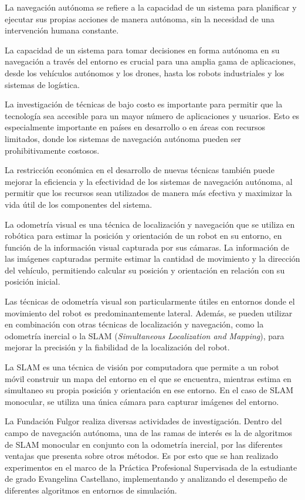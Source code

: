 \documentclass[
11pt, %
codirector, %
]{charter}
\begin{document}
La navegación autónoma se refiere a la capacidad de un sistema para planificar y ejecutar sus propias acciones de manera autónoma, sin la necesidad de una intervención humana constante.

La capacidad de un sistema para tomar decisiones en forma autónoma en su navegación a través del entorno es crucial para una amplia gama de aplicaciones, desde los vehículos autónomos y los drones, hasta los robots industriales y los sistemas de logística.

La investigación de técnicas de bajo costo es importante para permitir que la tecnología sea accesible para un mayor número de aplicaciones y usuarios. Esto es especialmente importante en países en desarrollo o en áreas con recursos limitados, donde los sistemas de navegación autónoma pueden ser prohibitivamente costosos.

La restricción económica en el desarrollo de nuevas técnicas también puede mejorar la eficiencia y la efectividad de los sistemas de navegación autónoma, al permitir que los recursos sean utilizados de manera más efectiva y maximizar la vida útil de los componentes del sistema.

La odometría visual es una técnica de localización y navegación que se utiliza en robótica para estimar la posición y orientación de un robot en su entorno, en función de la información visual capturada por sus cámaras. La información de las imágenes capturadas permite estimar la cantidad de movimiento y la dirección del vehículo, permitiendo calcular su posición y orientación en relación con su posición inicial.

Las técnicas de odometría visual son particularmente útiles en entornos donde el movimiento del robot es predominantemente lateral. Además, se pueden utilizar en combinación con otras técnicas de localización y navegación, como la odometría inercial o la SLAM (\textit{Simultaneous Localization and Mapping}), para mejorar la precisión y la fiabilidad de la localización del robot.

La SLAM es una técnica de visión por computadora que permite a un robot móvil construir un mapa del entorno en el que se encuentra, mientras estima en simultaneo su propia posición y orientación en ese entorno. En el caso de SLAM monocular, se utiliza una única cámara para capturar imágenes del entorno.

La Fundación Fulgor realiza diversas actividades de investigación. Dentro del campo de navegación autónoma, una de las ramas de interés es la de algoritmos de SLAM monocular en conjunto con la odometría inercial, por las diferentes ventajas que presenta sobre otros métodos. Es por esto que se han realizado experimentos en el marco de la Práctica Profesional Supervisada de la estudiante de grado Evangelina Castellano, implementando y analizando el desempeño de diferentes algoritmos en entornos de simulación.
\end{document}

